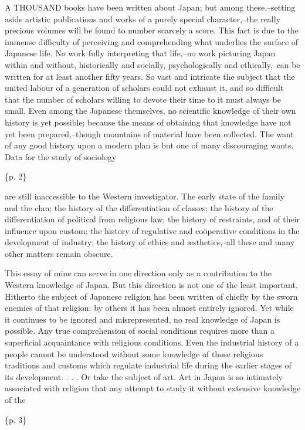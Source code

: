A THOUSAND books have been written about Japan; but among these,--setting aside artistic publications and works of a purely special character,--the really precious volumes will be found to number scarcely a score. This fact is due to the immense difficulty of perceiving and comprehending what underlies the surface of Japanese life. No work fully interpreting that life,--no work picturing Japan within and without, historically and socially, psychologically and ethically,--can be written for at least another fifty years. So vast and intricate the subject that the united labour of a generation of scholars could not exhaust it, and so difficult that the number of scholars willing to devote their time to it must always be small. Even among the Japanese themselves, no scientific knowledge of their own history is yet possible; because the means of obtaining that knowledge have not yet been prepared,--though mountains of material have been collected. The want of any good history upon a modern plan is but one of many discouraging wants. Data for the study of sociology

\{p. 2\}

are still inaccessible to the Western investigator. The early state of the family and the clan; the history of the differentiation of classes; the history of the differentiation of political from religious law; the history of restraints, and of their influence upon custom; the history of regulative and coöperative conditions in the development of industry; the history of ethics and æsthetics,--all these and many other matters remain obscure.

This essay of mine can serve in one direction only as a contribution to the Western knowledge of Japan. But this direction is not one of the least important. Hitherto the subject of Japanese religion has been written of chiefly by the sworn enemies of that religion: by others it has been almost entirely ignored. Yet while it continues to be ignored and misrepresented, no real knowledge of Japan is possible. Any true comprehension of social conditions requires more than a superficial acquaintance with religious conditions. Even the industrial history of a people cannot be understood without some knowledge of those religious traditions and customs which regulate industrial life during the earlier stages of its development. . . . Or take the subject of art. Art in Japan is so intimately associated with religion that any attempt to study it without extensive knowledge of the

\{p. 3\}


